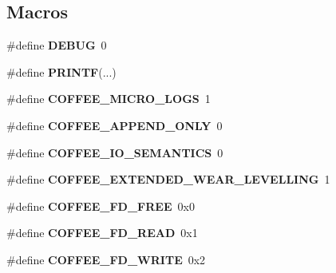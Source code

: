 \subsection*{Macros}
\begin{DoxyCompactItemize}
\item 
\hypertarget{cfs-coffee_8c_ad72dbcf6d0153db1b8d8a58001feed83}{}\#define {\bfseries D\+E\+B\+U\+G}~0\label{cfs-coffee_8c_ad72dbcf6d0153db1b8d8a58001feed83}

\item 
\hypertarget{cfs-coffee_8c_a1f464e950a4fa11e8821b5c725921a15}{}\#define {\bfseries P\+R\+I\+N\+T\+F}(...)\label{cfs-coffee_8c_a1f464e950a4fa11e8821b5c725921a15}

\item 
\hypertarget{cfs-coffee_8c_a9a9ac032176f4171d26a559027176d5d}{}\#define {\bfseries C\+O\+F\+F\+E\+E\+\_\+\+M\+I\+C\+R\+O\+\_\+\+L\+O\+G\+S}~1\label{cfs-coffee_8c_a9a9ac032176f4171d26a559027176d5d}

\item 
\hypertarget{cfs-coffee_8c_ad950ccb1be281496b1267f328d989ae8}{}\#define {\bfseries C\+O\+F\+F\+E\+E\+\_\+\+A\+P\+P\+E\+N\+D\+\_\+\+O\+N\+L\+Y}~0\label{cfs-coffee_8c_ad950ccb1be281496b1267f328d989ae8}

\item 
\hypertarget{cfs-coffee_8c_a211105bfa45286e171dc99fccc987cd4}{}\#define {\bfseries C\+O\+F\+F\+E\+E\+\_\+\+I\+O\+\_\+\+S\+E\+M\+A\+N\+T\+I\+C\+S}~0\label{cfs-coffee_8c_a211105bfa45286e171dc99fccc987cd4}

\item 
\hypertarget{cfs-coffee_8c_acdb963eb29c3a7302257462270d1bd40}{}\#define {\bfseries C\+O\+F\+F\+E\+E\+\_\+\+E\+X\+T\+E\+N\+D\+E\+D\+\_\+\+W\+E\+A\+R\+\_\+\+L\+E\+V\+E\+L\+L\+I\+N\+G}~1\label{cfs-coffee_8c_acdb963eb29c3a7302257462270d1bd40}

\item 
\hypertarget{cfs-coffee_8c_a1d17d47089c08259c03b3fc02095d044}{}\#define {\bfseries C\+O\+F\+F\+E\+E\+\_\+\+F\+D\+\_\+\+F\+R\+E\+E}~0x0\label{cfs-coffee_8c_a1d17d47089c08259c03b3fc02095d044}

\item 
\hypertarget{cfs-coffee_8c_a64f2b4d0c0ffca22fbb3de3484d64615}{}\#define {\bfseries C\+O\+F\+F\+E\+E\+\_\+\+F\+D\+\_\+\+R\+E\+A\+D}~0x1\label{cfs-coffee_8c_a64f2b4d0c0ffca22fbb3de3484d64615}

\item 
\hypertarget{cfs-coffee_8c_a3125d424b442d57a104841e251617add}{}\#define {\bfseries C\+O\+F\+F\+E\+E\+\_\+\+F\+D\+\_\+\+W\+R\+I\+T\+E}~0x2\label{cfs-coffee_8c_a3125d424b442d57a104841e251617add}


\end{DoxyCompactItemize}
